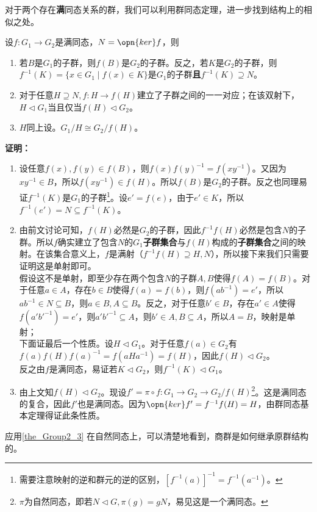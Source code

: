 对于两个存在\textbf{满}同态关系的群，我们可以利用群同态定理，进一步找到结构上的相似之处。
\begin{theorem}{}\label{the_Group2_3}
设$f:G_1\to G_2$是满同态，$N=\opn{ker}f$，则
\begin{enumerate}
\item 若$B$是$G_1$的子群，则$f(B)$是$G_2$的子群。反之，若$K$是$G_2$的子群，则$f^{-1}(K)=\{x\in G_1\mid f(x)\in K\}$是$G_1$的子群\textbf{且$f^{-1}(K)\supseteq N$}。
\item 对于任意$H\supseteq N,f:H\to f(H)$建立了子群之间的一一对应；在该双射下，$H\lhd G_1$当且仅当$f(H)\lhd G_2$。
\item $H$同上设。$G_1/H\cong G_2/f(H)$。
\end{enumerate}
\end{theorem}
\textbf{证明：}
\begin{enumerate}
\item 设任意$f(x),f(y)\in f(B)$，则$f(x)f(y)^{-1}=f(xy^{-1})$。又因为$xy^{-1}\in B$，所以$f(xy^{-1})\in f(H)$。所以$f(B)$是$G_2$的子群。反之也同理易证$f^{-1}(K)$是$G_1$的子群\footnote{需要注意映射的逆和群元的逆的区别，$[f^{-1}(a)]^{-1}=f^{-1}(a^{-1})$。}。设$e'=f(e)$，由于$e'\in K$，所以$f^{-1}(e')=N\subseteq f^{-1}(K) $。
\item 
由前文讨论可知，$f(H)$必然是$G_2$的子群，因此$f^{-1}f(H)$必然是包含$N$的子群。所以$f$确实建立了包含$N$的$G_1$\textbf{子群集合}与$f(H)$构成的\textbf{子群集合}之间的映射。在该集合意义上，$f$是满射（$f^{-1}f(H)\supseteq H,N$），所以接下来我们只需要证明这是单射即可。\\


假设这不是单射，即至少存在两个包含$N$的子群$A,B$使得$f(A)=f(B)$。对于任意$a\in A$，存在$b\in B$使得$f(a)=f(b)$，则$f(ab^{-1})=e'$，所以$ab^{-1}\in N\subseteq B$，则$a\in B, A\subseteq B$。反之，对于任意$b'\in B$，存在$a'\in A$使得$f(a'b'^{-1})=e'$，则$a'b'^{-1}\subseteq A$，则$b'\in A,B\subseteq A$，所以$A=B$，映射是单射；\\
下面证最后一个性质。设$H\lhd G_1$。对于任意$f(a)\in G_2$有$f(a)f(H)f(a)^{-1}=f(aHa^{-1})=f(H)$，因此$f(H)\lhd G_2$。\\
反之由$f$是满同态，易证若$K\lhd G_2$，则$f^{-1}(K)\lhd G_1$。\\
\item 由上文知$f(H)\lhd G_2$。现设$f'=\pi \circ f:G_1\to G_2\to G_2/f(H)$\footnote{$\pi$为自然同态，即若$N\lhd G,\pi(g)=gN$，易见这是一个满同态。}。这是满同态的复合，因此$f'$也是满同态。因为$\opn{ker}f'=f^{-1}f(H)=H$，由群同态基本定理得证此条性质。
\end{enumerate}
应用\autoref{the_Group2_3} 在自然同态上，可以清楚地看到，商群是如何继承原群结构的。

